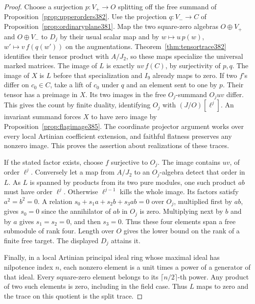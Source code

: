 \documentclass[a4paper,11pt]{article}
\theoremstyle{definition}
\theoremstyle{remark}
\numberwithin{equation}{section}
\begin{document}
\begin{proof}
Choose a surjection \(p:V_+\to O\) splitting off the free
summand of Proposition~\ref{prop:upperorders382}. Use the
projection \(q:V_-\to C\) of Proposition~\ref{prop:ordinaryplane381}.
Map the two square-zero algebras \(O\oplus V_+\) and
\(O\oplus V_-\) to \(D_j\) by their usual scalar map and
by \(w\mapsto u\,p(w)\), \(w'\mapsto v\,f(q(w'))\) on the
augmentations. Theorem~\ref{thm:tensortrace382} identifies
their tensor product with \(A/J_2\), so these maps specialize
the universal marked matrices. The image of \(L\) is exactly
\(uv\, f(C)\), by surjectivity of \(p,q\). The image of \(X\)
is \(L\) before that specialization and \(I_9\) already maps
to zero. If two \(f\)'s differ on \(c_0\in C\), take a lift
of \(c_0\) under \(q\) and an element sent to one by \(p\).
Their tensor has a preimage in \(X\). Its two images in the
free \(O_j\)-summand \(O_j uv\) differ. This gives the count
by finite duality, identifying \(O_j\) with \((J/O)[\ell^j]\).
An invariant summand forces \(X\) to have zero image by
Proposition~\ref{prop:flagimage385}. The coordinate projector
argument works over every local Artinian coefficient extension,
and faithful flatness preserves any nonzero image. This proves
the assertion about realizations of these traces.

If the stated factor exists, choose \(f\) surjective to \(O_j\).
The image contains \(uv\), of order \(\ell^j\). Conversely let
a map from \(A/J_2\) to an \(O_j\)-algebra detect that order
in \(L\). As \(L\) is spanned by products from its two pure
modules, one such product \(ab\) must have order \(\ell^j\).
Otherwise \(\ell^{j-1}\) kills the whole image. Its factors
satisfy \(a^2=b^2=0\). A relation
\(s_0+s_1a+s_2b+s_3ab=0\) over \(O_j\), multiplied first
by \(ab\), gives \(s_0=0\) since the annihilator of \(ab\)
in \(O_j\) is zero. Multiplying next by \(b\) and by \(a\)
gives \(s_1=s_2=0\), and then \(s_3=0\). Thus these four
elements span a free submodule of rank four. Length over
\(O\) gives the lower bound on the rank of a finite free
target. The displayed \(D_j\) attains it.

Finally, in a local Artinian principal ideal ring whose maximal
ideal has nilpotence index \(n\), each nonzero element is a unit
times a power of a generator of that ideal. Every square-zero
element belongs to its \(\lceil n/2\rceil\)-th power. Any
product of two such elements is zero, including in the field
case. Thus \(L\) maps to zero and the trace on this quotient
is the split trace.
\end{proof}
\end{document}
